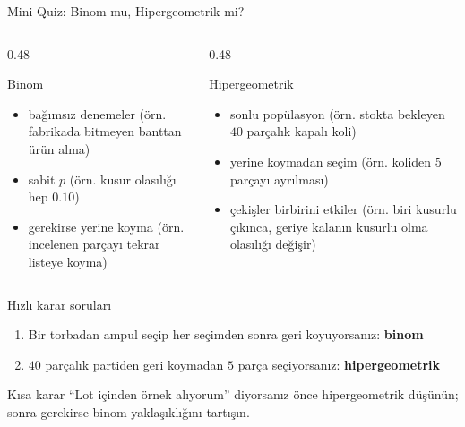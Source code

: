 \documentclass[light]{lutbeamer}
\begin{document}
\begin{frame}{Mini Quiz: Binom mu, Hipergeometrik mi?}
    \small
    \begin{columns}[T]
        \begin{column}{0.48\textwidth}
            \begin{block}{Binom}
                \begin{itemize}
                    \item bağımsız denemeler (örn. fabrikada bitmeyen banttan ürün alma)
                    \item sabit \(p\) (örn. kusur olasılığı hep \(0.10\))
                    \item gerekirse yerine koyma (örn. incelenen parçayı tekrar listeye koyma)
                \end{itemize}
            \end{block}
        \end{column}
        \begin{column}{0.48\textwidth}
            \begin{block}{Hipergeometrik}
                \begin{itemize}
                    \item sonlu popülasyon (örn. stokta bekleyen \(40\) parçalık kapalı koli)
                    \item yerine koymadan seçim (örn. koliden \(5\) parçayı ayrılması)
                    \item çekişler birbirini etkiler (örn. biri kusurlu çıkınca, geriye kalanın kusurlu olma olasılığı değişir)
                \end{itemize}
            \end{block}
        \end{column}
    \end{columns}

    \begin{exampleblock}{Hızlı karar soruları}
        \begin{enumerate}
            \item Bir torbadan ampul seçip her seçimden sonra geri koyuyorsanız: \textbf{binom}
            \item \(40\) parçalık partiden geri koymadan \(5\) parça seçiyorsanız: \textbf{hipergeometrik}
        \end{enumerate}
    \end{exampleblock}

    \begin{block}{Kısa karar}
        ``Lot içinden örnek alıyorum'' diyorsanız önce hipergeometrik düşünün; sonra gerekirse binom yaklaşıklığını tartışın.
    \end{block}
\end{frame}
\end{document}
